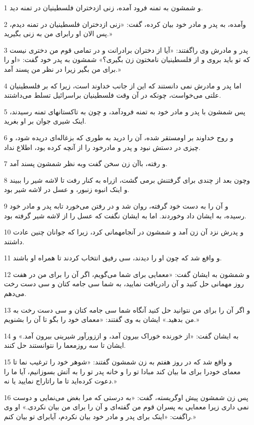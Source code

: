 \par 1 و شمشون به تمنه فرود آمده، زنی ازدختران فلسطینیان در تمنه دید.
\par 2 وآمده، به پدر و مادر خود بیان کرده، گفت: «زنی ازدختران فلسطینیان در تمنه دیدم، پس الان او رابرای من به زنی بگیرید.»
\par 3 پدر و مادرش وی راگفتند: «آیا از دختران برادرانت و در تمامی قوم من دختری نیست که تو باید بروی و از فلسطینیان نامختون زن بگیری؟» شمشون به پدر خود گفت: «او را برای من بگیر زیرا در نظر من پسند آمد.»
\par 4 اما پدر و مادرش نمی دانستند که این از جانب خداوند است، زیرا که بر فلسطینیان علتی می‌خواست، چونکه در آن وقت فلسطینیان براسرائیل تسلط می‌داشتند.
\par 5 پس شمشون با پدر و مادر خود به تمنه فرودآمد، و چون به تاکستانهای تمنه رسیدند، اینک شیری جوان بر او بغرید.
\par 6 و روح خداوند بر اومستقر شده، آن را درید به طوری که بزغاله‌ای دریده شود، و چیزی در دستش نبود و پدر و مادرخود را از آنچه کرده بود، اطلاع نداد.
\par 7 و رفته، باآن زن سخن گفت وبه نظر شمشون پسند آمد.
\par 8 وچون بعد از چندی برای گرفتنش برمی گشت، ازراه به کنار رفت تا لاشه شیر را ببیند و اینک انبوه زنبور، و عسل در لاشه شیر بود.
\par 9 و آن را به دست خود گرفته، روان شد و در رفتن می‌خورد تابه پدر و مادر خود رسیده، به ایشان داد وخوردند. اما به ایشان نگفت که عسل را از لاشه شیر گرفته بود.
\par 10 و پدرش نزد آن زن آمد و شمشون در آنجامهمانی کرد، زیرا که جوانان چنین عادت داشتند.
\par 11 و واقع شد که چون او را دیدند، سی رفیق انتخاب کردند تا همراه او باشند.
\par 12 و شمشون به ایشان گفت: «معمایی برای شما می‌گویم، اگر آن را برای من در هفت روز مهمانی حل کنید و آن رادریافت نمایید، به شما سی جامه کتان و سی دست رخت می‌دهم.
\par 13 و اگر آن را برای من نتوانید حل کنید آنگاه شما سی جامه کتان و سی دست رخت به من بدهید.» ایشان به وی گفتند: «معمای خود را بگو تا آن را بشنویم.»
\par 14 به ایشان گفت: «از خورنده خوراک بیرون آمد، و اززورآور شیرینی بیرون آمد.» و ایشان تا سه روزمعما را نتوانستند حل کنند.
\par 15 و واقع شد که در روز هفتم به زن شمشون گفتند: «شوهر خود را ترغیب نما تا معمای خودرا برای ما بیان کند مبادا تو را و خانه پدر تو را به آتش بسوزانیم، آیا ما را دعوت کرده‌اید تا ما راتاراج نمایید یا نه.»
\par 16 پس زن شمشون پیش اوگریسته، گفت: «به درستی که مرا بغض می‌نمایی و دوست نمی داری زیرا معمایی به پسران قوم من گفته‌ای و آن را برای من بیان نکردی.» او وی راگفت: «اینک برای پدر و مادر خود بیان نکردم، آیابرای تو بیان کنم.»
